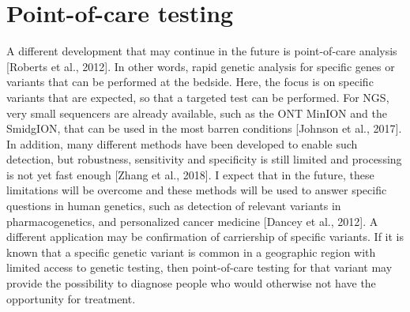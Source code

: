 {\section{Point-of-care testing}
A different development that may continue in the future is point-of-care analysis [Roberts et al., 2012]. 
In other words, rapid genetic analysis for specific genes or variants that can be performed at the bedside. 
Here, the focus is on specific variants that are expected, so that a targeted test can be performed. 
For NGS, very small sequencers are already available, such as the ONT MinION and the SmidgION, that can be used in the most barren conditions [Johnson et al., 2017]. 
In addition, many different methods have been developed to enable such detection, but robustness, sensitivity and specificity is still limited and processing is not yet fast enough [Zhang et al., 2018]. 
I expect that in the future, these limitations will be overcome and these methods will be used to answer specific questions in human genetics, such as detection of relevant variants in pharmacogenetics, and personalized cancer medicine [Dancey et al., 2012]. 
A different application may be confirmation of carriership of specific variants. 
If it is known that a specific genetic variant is common in a geographic region with limited access to genetic testing, then point-of-care testing for that variant may provide the possibility to diagnose people who would otherwise not have the opportunity for treatment. 

}
